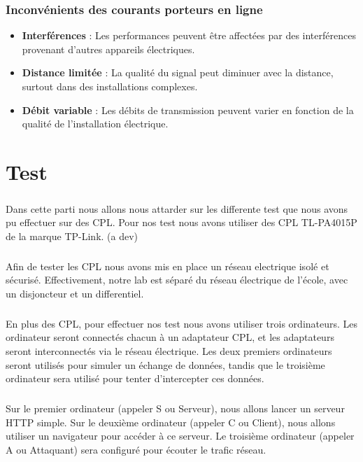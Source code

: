 \documentclass[a4paper,twocolumn]{report}
\begin{document}
\subsection{Inconvénients des courants porteurs en ligne}
\begin{itemize}
    \item \textbf{Interférences} : Les performances peuvent être affectées par des interférences provenant d'autres appareils électriques.
    \item \textbf{Distance limitée} : La qualité du signal peut diminuer avec la distance, surtout dans des installations complexes.
    \item \textbf{Débit variable} : Les débits de transmission peuvent varier en fonction de la qualité de l'installation électrique.
\end{itemize}



\chapter{Test}
\paragraph{}Dans cette parti nous allons nous attarder sur les differente test que nous avons pu effectuer sur des CPL. Pour nos test nous avons utiliser des CPL TL-PA4015P de la marque TP-Link. (a dev)
\paragraph{}Afin de tester les CPL nous avons mis en place un réseau electrique isolé et sécurisé. Effectivement, notre lab est séparé du réseau électrique de l'école, avec un disjoncteur et un differentiel.
\paragraph{}En plus des CPL, pour effectuer nos test nous avons utiliser trois ordinateurs. Les ordinateur seront connectés chacun à un adaptateur CPL, et les adaptateurs seront interconnectés via le réseau électrique. Les deux premiers ordinateurs seront utilisés pour simuler un échange de données, tandis que le troisième ordinateur sera utilisé pour tenter d'intercepter ces données.
\paragraph{}Sur le premier ordinateur (appeler S ou Serveur), nous allons lancer un serveur HTTP simple. Sur le deuxième ordinateur (appeler C ou Client), nous allons utiliser un navigateur pour accéder à ce serveur. Le troisième ordinateur (appeler A ou Attaquant) sera configuré pour écouter le trafic réseau.
\end{document}
